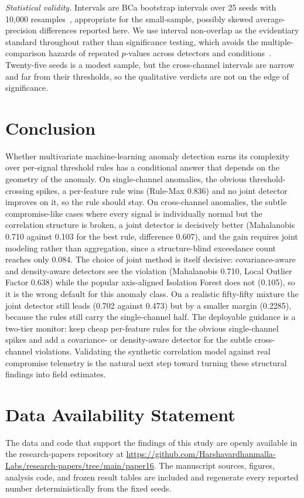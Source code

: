 \documentclass[journal]{IEEEtran}
\begin{document}
\emph{Statistical validity.} Intervals are BCa bootstrap intervals over 25 seeds with 10{,}000
resamples~\cite{efron1987bca,efron1994introduction}, appropriate for the small-sample, possibly
skewed average-precision differences reported here. We use interval non-overlap as the evidentiary
standard throughout rather than significance testing, which avoids the multiple-comparison hazards of
repeated $p$-values across detectors and conditions~\cite{wohlin2012experimentation}. Twenty-five
seeds is a modest sample, but the cross-channel intervals are narrow and far from their thresholds,
so the qualitative verdicts are not on the edge of significance.

\section{Conclusion}
Whether multivariate machine-learning anomaly detection earns its complexity over per-signal
threshold rules has a conditional answer that depends on the geometry of the anomaly. On
single-channel anomalies, the obvious threshold-crossing spikes, a per-feature rule wins (Rule-Max
0.836) and no joint detector improves on it, so the rule should stay. On cross-channel anomalies, the
subtle compromise-like cases where every signal is individually normal but the correlation structure
is broken, a joint detector is decisively better (Mahalanobis 0.710 against 0.103 for the best rule,
difference 0.607), and the gain requires joint modeling rather than aggregation, since a
structure-blind exceedance count reaches only 0.084. The choice of joint method is itself decisive:
covariance-aware and density-aware detectors see the violation (Mahalanobis 0.710, Local Outlier
Factor 0.638) while the popular axis-aligned Isolation Forest does not (0.105), so it is the wrong
default for this anomaly class. On a realistic fifty-fifty mixture the joint detector still leads
(0.702 against 0.473) but by a smaller margin (0.2285), because the rules still carry the
single-channel half. The deployable guidance is a two-tier monitor: keep cheap per-feature rules for
the obvious single-channel spikes and add a covariance- or density-aware detector for the subtle
cross-channel violations. Validating the synthetic correlation model against real compromise
telemetry is the natural next step toward turning these structural findings into field estimates.

\section*{Data Availability Statement}
The data and code that support the findings of this study are openly available in the research-papers repository at \url{https://github.com/Harshavardhanmalla-Labs/research-papers/tree/main/paper16}. The manuscript sources, figures, analysis code, and frozen result tables are included and regenerate every reported number deterministically from the fixed seeds.
\end{document}
